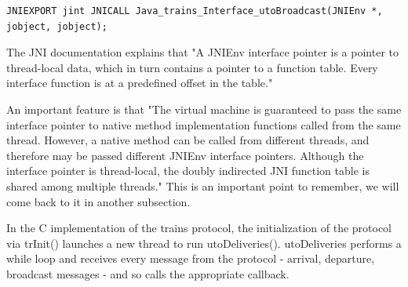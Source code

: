 \documentclass[a4paper,10pt]{report}
\begin{document}
\lstset{language=C}
\lstset{commentstyle=\textit} 
\begin{lstlisting}
JNIEXPORT jint JNICALL Java_trains_Interface_utoBroadcast(JNIEnv *, jobject, jobject);
\end{lstlisting}

The JNI documentation\cite{jnidoc} explains that "A JNIEnv interface pointer is a pointer to thread-local data, which in turn contains a 
pointer to a function table. Every interface function is at a predefined offset in the table."

An important feature is that "The virtual machine is guaranteed to pass the same interface pointer to native method implementation functions called from the same thread. 
However, a native method can be called from different threads, and therefore may be passed different JNIEnv interface pointers. 
Although the interface pointer is thread-local, the doubly indirected JNI function table is shared among multiple threads."
This is an important point to remember, we will come back to it in another subsection.

In the C implementation of the trains protocol, the initialization of the protocol via trInit() launches a new thread to run
utoDeliveries(). utoDeliveries performs a while loop and receives every message from the protocol - arrival, departure, broadcast messages -
and so calls the appropriate callback.\\
 
\end{document}
